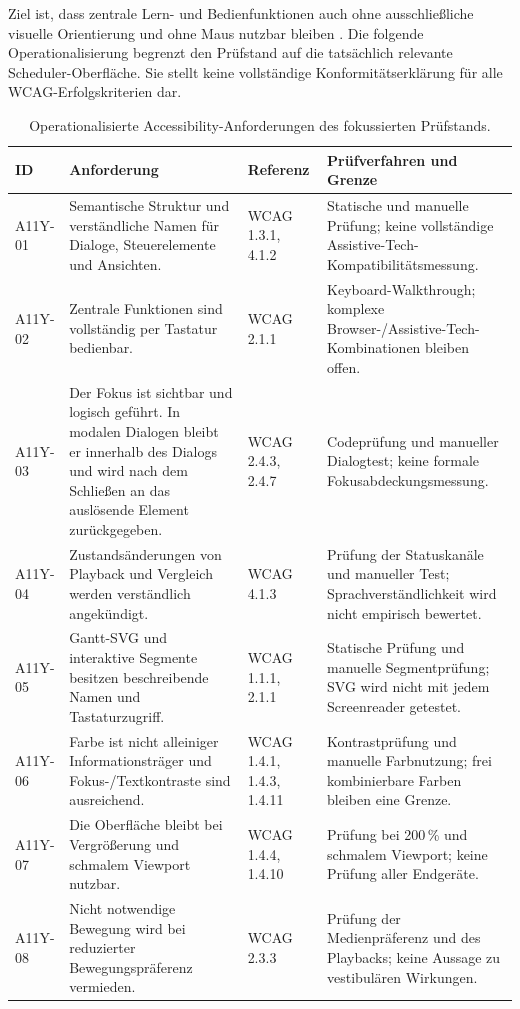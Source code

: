 Ziel ist, dass zentrale Lern- und Bedienfunktionen auch ohne ausschließliche visuelle Orientierung und ohne Maus nutzbar bleiben \cite{wcag2018}. Die folgende Operationalisierung begrenzt den Prüfstand auf die tatsächlich relevante Scheduler-Oberfläche. Sie stellt keine vollständige Konformitätserklärung für alle WCAG-Erfolgskriterien dar.

\begin{table}[H]
\centering
\caption{Operationalisierte Accessibility-Anforderungen des fokussierten Prüfstands.}
\label{tab:a11y-anforderungen}
\small
\begin{tabularx}{\textwidth}{>{\raggedright\arraybackslash}p{}>{\raggedright\arraybackslash}X >{\raggedright\arraybackslash}p{}>{\raggedright\arraybackslash}X}
\textbf{ID} & \textbf{Anforderung} & \textbf{Referenz} & \textbf{Prüfverfahren und Grenze} \\
\hline
A11Y-01 & Semantische Struktur und verständliche Namen für Dialoge, Steuerelemente und Ansichten. & WCAG 1.3.1, 4.1.2 & Statische und manuelle Prüfung; keine vollständige Assistive-Tech-Kompatibilitätsmessung. \\
A11Y-02 & Zentrale Funktionen sind vollständig per Tastatur bedienbar. & WCAG 2.1.1 & Keyboard-Walkthrough; komplexe Browser-/Assistive-Tech-Kombinationen bleiben offen. \\
A11Y-03 & Der Fokus ist sichtbar und logisch geführt. In modalen Dialogen bleibt er innerhalb des Dialogs und wird nach dem Schließen an das auslösende Element zurückgegeben. & WCAG 2.4.3, 2.4.7 & Codeprüfung und manueller Dialogtest; keine formale Fokusabdeckungsmessung. \\
A11Y-04 & Zustandsänderungen von Playback und Vergleich werden verständlich angekündigt. & WCAG 4.1.3 & Prüfung der Statuskanäle und manueller Test; Sprachverständlichkeit wird nicht empirisch bewertet. \\
A11Y-05 & Gantt-SVG und interaktive Segmente besitzen beschreibende Namen und Tastaturzugriff. & WCAG 1.1.1, 2.1.1 & Statische Prüfung und manuelle Segmentprüfung; SVG wird nicht mit jedem Screenreader getestet. \\
A11Y-06 & Farbe ist nicht alleiniger Informationsträger und Fokus-/Textkontraste sind ausreichend. & WCAG 1.4.1, 1.4.3, 1.4.11 & Kontrastprüfung und manuelle Farbnutzung; frei kombinierbare Farben bleiben eine Grenze. \\
A11Y-07 & Die Oberfläche bleibt bei Vergrößerung und schmalem Viewport nutzbar. & WCAG 1.4.4, 1.4.10 & Prüfung bei 200\,\% und schmalem Viewport; keine Prüfung aller Endgeräte. \\
A11Y-08 & Nicht notwendige Bewegung wird bei reduzierter Bewegungspräferenz vermieden. & WCAG 2.3.3 & Prüfung der Medienpräferenz und des Playbacks; keine Aussage zu vestibulären Wirkungen. \\
\end{tabularx}
\end{table}

